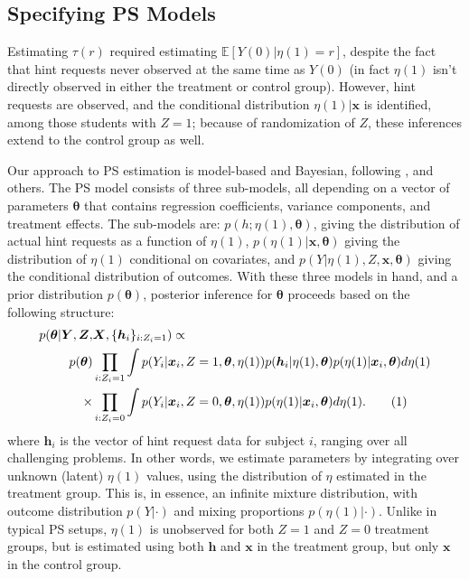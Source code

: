 \documentclass{article}\usepackage[]{graphicx}\usepackage[]{color}
\newcommand{\EE}{\mathbb{E}}
\newcommand\numberthis{\addtocounter{equation}{1}\tag{\theequation}}
\begin{document}
\subsection{Specifying PS Models}\label{sec:psModel}
Estimating $\tau(r)$ required estimating $\EE[Y(0)|\eta(1)=r]$,
despite the fact that hint requests never observed at the same time as
$Y(0)$ (in fact $\eta(1)$ isn't directly observed in either the
treatment or control group).
However, hint requests are observed, and the conditional distribution
$\eta(1)|\bm{x}$ is identified, among those students with $Z=1$;
because of randomization of $Z$, these inferences extend to the
control group as well.

Our approach to PS estimation is model-based and Bayesian, following
\citet{jin2008principal},
\citet{schwartz2011bayesian} and others.
The PS model consists of three sub-models, all depending on a
 vector of parameters $\bm{\theta}$ that contains regression
 coefficients, variance components, and treatment effects.
The sub-models are:
$p(h;\eta(1),\bm{\theta})$, giving the distribution of actual hint
requests as a function of $\eta(1)$, $p(\eta(1)|\bm{x},\bm{\theta})$
giving the distribution of $\eta(1)$ conditional on covariates, and
$p(Y|\eta(1),Z,\bm{x},\bm{\theta})$ giving the conditional
distribution of outcomes.
With these three models in hand, and a prior distribution
$p(\bm{\theta})$, posterior inference for $\bm{\theta}$ proceeds based
on the following structure:
\begin{align*}
p(\bm{\theta}|\bm{Y},\bm{Z},&\bm{X},\{\bm{h}_i\}_{i:Z_i=1})\propto\\
p(\bm{\theta})&\displaystyle\prod_{i: Z_i=1}\int p(Y_i|\bm{x}_i,Z=1,\bm{\theta},\eta(1))p(\bm{h}_{i}|\eta(1),\bm{\theta})p(\eta(1)|\bm{x}_i,\bm{\theta})d\eta(1)\\
\times&\displaystyle\prod_{i:Z_i=0} \int p(Y_i|\bm{x}_i,Z=0,\bm{\theta},\eta(1))p(\eta(1)|\bm{x}_i,\bm{\theta})d\eta(1).\numberthis\label{eq:posteriorEta}
\end{align*}
where $\bm{h}_i$ is the vector of hint request data for subject $i$,
ranging over all challenging problems.
In other words, we estimate parameters by integrating over unknown
(latent) $\eta(1)$ values, using the distribution of $\eta$ estimated
in the treatment group.
This is, in essence, an infinite mixture distribution, with outcome
distribution $p(Y|\cdot)$ and mixing proportions $p(\eta(1)|\cdot)$.
Unlike in typical PS setups, $\eta(1)$ is unobserved for both $Z=1$
and $Z=0$ treatment groups, but is estimated using both $\bm{h}$ and
$\bm{x}$ in the treatment group, but only $\bm{x}$ in the control
group.
\end{document}
